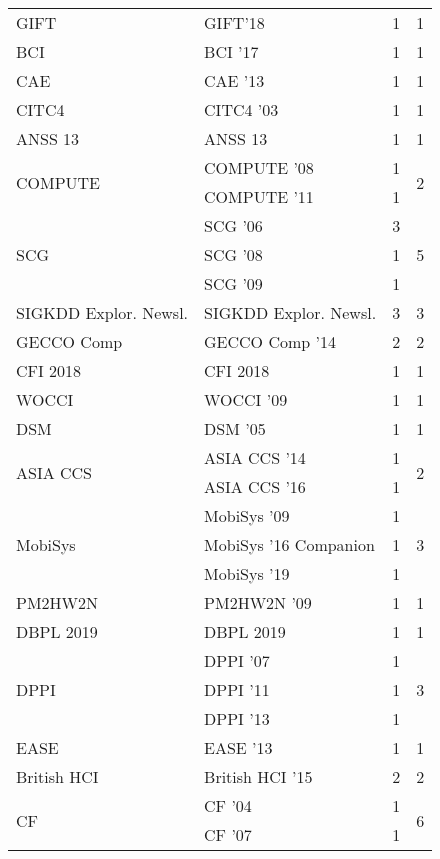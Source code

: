 \begin{table*}[t]
\begin{tabular}{llrr}
\multirow{1}{*}{GIFT} & GIFT'18 & 1 & \multirow{1}{*}{1}\\
\multirow{1}{*}{BCI } & BCI '17 & 1 & \multirow{1}{*}{1}\\
\multirow{1}{*}{CAE } & CAE '13 & 1 & \multirow{1}{*}{1}\\
\multirow{1}{*}{CITC4 } & CITC4 '03 & 1 & \multirow{1}{*}{1}\\
\multirow{1}{*}{ANSS 13} & ANSS 13 & 1 & \multirow{1}{*}{1}\\
\multirow{2}{*}{COMPUTE } & COMPUTE '08 & 1 & \multirow{2}{*}{2}\\
& COMPUTE '11 & 1 &\\
\multirow{3}{*}{SCG } & SCG '06 & 3 & \multirow{3}{*}{5}\\
& SCG '08 & 1 &\\
& SCG '09 & 1 &\\
\multirow{1}{*}{SIGKDD Explor. Newsl.} & SIGKDD Explor. Newsl. & 3 & \multirow{1}{*}{3}\\
\multirow{1}{*}{GECCO Comp } & GECCO Comp '14 & 2 & \multirow{1}{*}{2}\\
\multirow{1}{*}{CFI 2018} & CFI 2018 & 1 & \multirow{1}{*}{1}\\
\multirow{1}{*}{WOCCI } & WOCCI '09 & 1 & \multirow{1}{*}{1}\\
\multirow{1}{*}{DSM } & DSM '05 & 1 & \multirow{1}{*}{1}\\
\multirow{2}{*}{ASIA CCS } & ASIA CCS '14 & 1 & \multirow{2}{*}{2}\\
& ASIA CCS '16 & 1 &\\
\multirow{3}{*}{MobiSys } & MobiSys '09 & 1 & \multirow{3}{*}{3}\\
& MobiSys '16 Companion & 1 &\\
& MobiSys '19 & 1 &\\
\multirow{1}{*}{PM2HW2N } & PM2HW2N '09 & 1 & \multirow{1}{*}{1}\\
\multirow{1}{*}{DBPL 2019} & DBPL 2019 & 1 & \multirow{1}{*}{1}\\
\multirow{3}{*}{DPPI } & DPPI '07 & 1 & \multirow{3}{*}{3}\\
& DPPI '11 & 1 &\\
& DPPI '13 & 1 &\\
\multirow{1}{*}{EASE } & EASE '13 & 1 & \multirow{1}{*}{1}\\
\multirow{1}{*}{British HCI } & British HCI '15 & 2 & \multirow{1}{*}{2}\\
\multirow{6}{*}{CF } & CF '04 & 1 & \multirow{6}{*}{6}\\
& CF '07 & 1 &\\

\end{tabular}
\end{table*}
